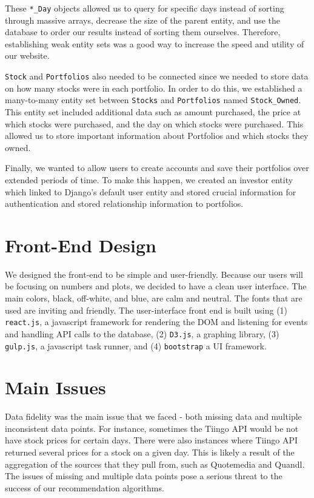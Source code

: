 \documentclass{article}
\begin{document}
These \texttt{*\_Day} objects allowed us to query for specific days instead of sorting through massive arrays, decrease the size of the parent entity, and use the database to order our results instead of sorting them ourselves.  Therefore, establishing weak entity sets was a good way to increase the speed and utility of our website.

\texttt{Stock} and \texttt{Portfolios} also needed to be connected since we needed to store data on how many stocks were in each portfolio.  In order to do this, we established a many-to-many entity set between \texttt{Stocks} and \texttt{Portfolios} named \texttt{Stock\_Owned}.  This entity set included additional data such as amount purchased, the price at which stocks were purchased, and the day on which stocks were purchased.  This allowed us to store important information about Portfolios and which stocks they owned.

Finally, we wanted to allow users to create accounts and save their portfolios over extended periods of time.  To make this happen, we created an investor entity which linked to Django’s default user entity and stored crucial information for authentication and stored relationship information to portfolios.


\section{Front-End Design} \label{sec:fe}
We designed the front-end to be simple and user-friendly. Because our users will be focusing on numbers and plots, we decided to have a clean user interface. The main colors, black, off-white, and blue, are calm and neutral. The fonts that are used are inviting and friendly. The user-interface front end is built using (1) \texttt{react.js}, a javascript framework for rendering the DOM and listening for events and handling API calls to the database, (2) \texttt{D3.js}, a graphing library, (3) \texttt{gulp.js}, a javascript task runner, and (4) \texttt{bootstrap} a UI framework.

\section{Main Issues} \label{sec:main_issues}
Data fidelity was the main issue that we faced - both missing data and multiple inconsistent data points. For instance, sometimes the Tiingo API would be not have stock prices for certain days. There were also instances where Tiingo API returned several prices for a stock on a given day. This is likely a result of the aggregation of the sources that they pull from, such as Quotemedia and Quandl. The issues of missing and multiple data points pose a serious threat to the success of our recommendation algorithms.
\end{document}
